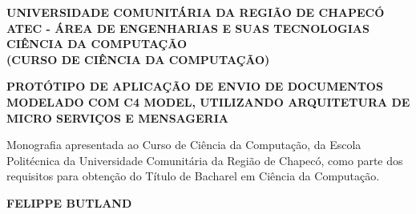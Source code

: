
    \begin{center}
    \vspace{1cm}
    
    \textbf{\MakeTextUppercase{Universidade Comunitária da Região de Chapecó}\\}
    \textbf{\MakeTextUppercase{ATEC - ÁREA DE ENGENHARIAS E SUAS TECNOLOGIAS}\\}
    \textbf{\MakeTextUppercase{CIÊNCIA DA COMPUTAÇÃO}\\}
    \textbf{\MakeTextUppercase{(CURSO DE CIÊNCIA DA COMPUTAÇÃO)}\\}

    \vspace{6cm}

    \MakeUppercase{\textbf{PROTÓTIPO DE APLICAÇÃO DE ENVIO DE DOCUMENTOS MODELADO COM C4
    MODEL, UTILIZANDO ARQUITETURA DE MICRO SERVIÇOS E MENSAGERIA}}

    \end{center}

    \vspace{3cm}

    \begin{flushright}
        \hspace*{7cm}
        \begin{minipage}{0.5\textwidth}

            \bfseries
            \SingleSpacing


            			 Monografia apresentada ao Curso de Ciência da Computação, da Escola Politécnica da Universidade Comunitária da Região de Chapecó, como  parte dos requisitos para obtenção do Título de Bacharel em Ciência da Computação.\\
        
        \end{minipage}
    \end{flushright}

    \vspace{0.5cm}
    \begin{center}
    \textbf{\MakeTextUppercase{Felippe Butland}}
    \end{center}
    \vspace{0.5cm}


